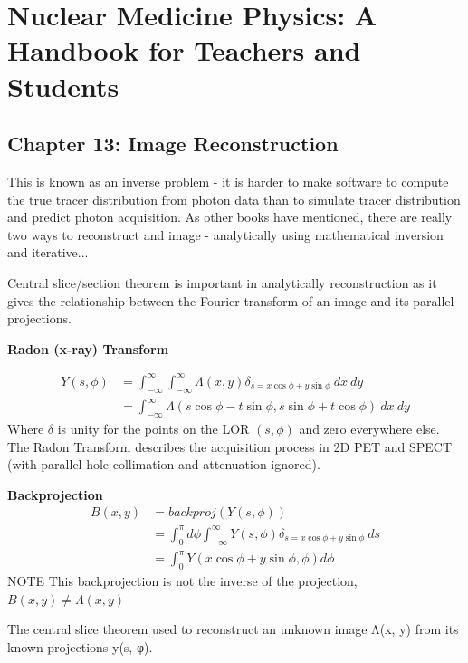 \documentclass{article}
\begin{document}
\newpage
\section{Nuclear Medicine Physics: A Handbook for Teachers and Students} \cite{Bailey2014}

\subsection{Chapter 13: Image Reconstruction}
This is known as an inverse problem - it is harder to make software to compute the true tracer distribution from photon data than to simulate tracer distribution and predict photon acquisition. As other books have mentioned, there are really two ways to reconstruct and image - analytically using mathematical inversion and iterative...


Central slice/section theorem is important in analytically reconstruction as it gives the relationship between the Fourier transform of an image and its parallel projections.

\textbf{Radon (x-ray) Transform}

\begin{equation}
\begin{split}
	Y(s,\phi) & = \int_{-\infty}^{\infty} \int_{-\infty}^{\infty} \Lambda (x,y) \delta_{s=x\cos\phi + y\sin\phi}\ dx\ dy\\
   & =\int_{-\infty}^\infty \Lambda (s\cos\phi - t\sin\phi, s\sin\phi + t\cos\phi)\ dx\ dy
    \label{eq.x-ray transform}
 \end{split}
\end{equation}	
Where $\delta$ is unity for the points on the LOR $(s,\phi)$ and zero everywhere else. The Radon Transform describes the acquisition process in 2D PET and SPECT (with parallel hole collimation and attenuation ignored).

\textbf{Backprojection}
\begin{equation}
\begin{split}
B(x,y) &= backproj(Y(s,\phi)) \\
& =\int_0^\pi d\phi \int_{-\infty}^{\infty} Y(s,\phi)\delta_{s=x\cos\phi + y\sin\phi}\ ds \\
& = \int_0^\pi Y(x\cos\phi + y\sin\phi, \phi) d\phi
\end{split}
\end{equation}
NOTE This backprojection is not the inverse of the projection, $B(x,y) \neq \Lambda(x,y)$ 

The central slice theorem used to reconstruct an unknown image Λ(x, y) from its known projections y(s, φ).
\end{document}
